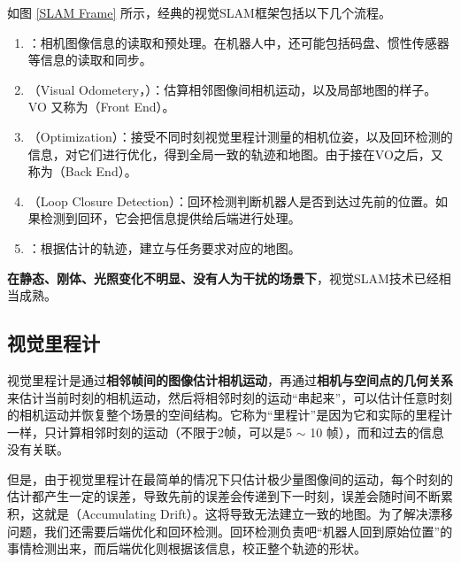 如图 \ref{SLAM Frame} 所示，经典的视觉SLAM框架包括以下几个流程。
\begin{enumerate}
    \setlength{\leftmargin}{1.2em} %
    \setlength{\parsep}{0ex} %
    \setlength{\topsep}{0.5ex} %
    \setlength{\itemsep}{0.2ex} %
    \setlength{\labelsep}{0.5em} %
    \setlength{\itemindent}{0.5em} %
    \setlength{\listparindent}{0em} %

    \item {}：相机图像信息的读取和预处理。在机器人中，还可能包括码盘、惯性传感器等信息的读取和同步。
    \item {}（Visual Odometery，）：估算相邻图像间相机运动，以及局部地图的样子。VO 又称为（Front End）。
    \item {}（Optimization）：接受不同时刻视觉里程计测量的相机位姿，以及回环检测的信息，对它们进行优化，得到全局一致的轨迹和地图。由于接在VO之后，又称为（Back End）。
    \item {}（Loop Closure Detection）：回环检测判断机器人是否到达过先前的位置。如果检测到回环，它会把信息提供给后端进行处理。
    \item {}：根据估计的轨迹，建立与任务要求对应的地图。
\end{enumerate}

\newpage

\textbf{在静态、刚体、光照变化不明显、没有人为干扰的场景下}，视觉SLAM技术已经相当成熟。

\subsection{视觉里程计}
视觉里程计是通过\textbf{相邻帧间的图像估计相机运动}，再通过\textbf{相机与空间点的几何关系}来估计当前时刻的相机运动，然后将相邻时刻的运动“串起来”，可以估计任意时刻的相机运动并恢复整个场景的空间结构。它称为“里程计”是因为它和实际的里程计一样，只计算相邻时刻的运动（不限于2帧，可以是5 $\sim$ 10 帧），而和过去的信息没有关联。

但是，由于视觉里程计在最简单的情况下只估计极少量图像间的运动，每个时刻的估计都产生一定的误差，导致先前的误差会传递到下一时刻，误差会随时间不断累积，这就是（Accumulating Drift）。这将导致无法建立一致的地图。为了解决漂移问题，我们还需要后端优化和回环检测。回环检测负责吧“机器人回到原始位置”的事情检测出来，而后端优化则根据该信息，校正整个轨迹的形状。

